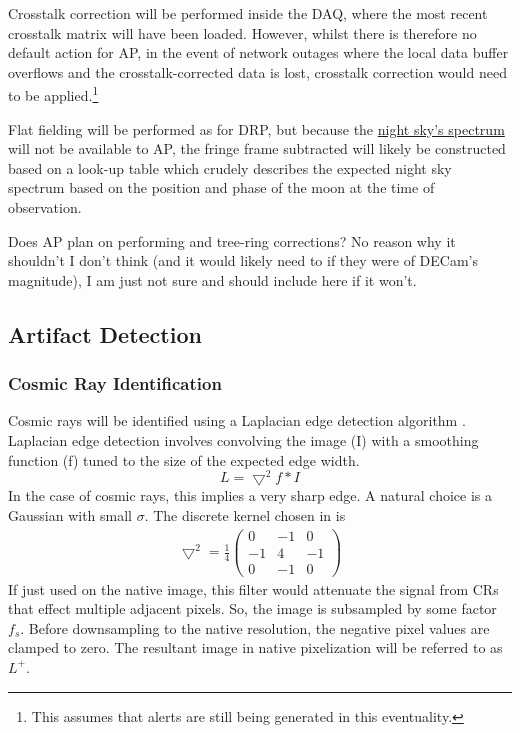 Crosstalk correction will be performed inside the DAQ, where the most recent crosstalk matrix will have been loaded. However, whilst there is therefore no default action for AP, in the event of network outages where the local data buffer overflows and the crosstalk-corrected data is lost, crosstalk correction would need to be applied.\footnote{ This assumes that alerts are still being generated in this eventuality.}

Flat fielding will be performed as for DRP, but because the \hyperref[sec:CPP:aux:nightSkySpectrum]{night sky's spectrum} will not be available to AP, the fringe frame subtracted will likely be constructed based on a look-up table which crudely describes the expected night sky spectrum based on the position and phase of the moon at the time of observation.



\begin{note}
	Does AP plan on performing \bfeffect and tree-ring corrections? No reason why it shouldn't I don't think (and it would likely need to if they were of DECam's magnitude), I am just not sure and should include here if it won't.
\end{note}





\subsection{Artifact Detection}
\label{sec:acArtifactDetection}

\subsubsection{Cosmic Ray Identification}
\label{sec:acCosmicRayDetection}
Cosmic rays will be identified using a Laplacian edge detection algorithm \citep{dokkum01}.  Laplacian edge detection involves convolving the image (I) with a smoothing function (f) tuned to the size of the expected edge width.
\[
L = \bigtriangledown^2f\ast I
\]
In the case of cosmic rays, this implies a very sharp edge.  A natural choice is a Gaussian with small $\sigma$.  The discrete kernel chosen in \citep{dokkum01} is
\begin{align}
\bigtriangledown^2 = \frac{1}{4}\left( \begin{array}{ccc}
0 & -1 & 0 \\
-1 & 4 & -1 \\
0 & -1 & 0 \end{array} \right)
\end{align}
If just used on the native image, this filter would attenuate the signal from CRs that effect multiple
adjacent pixels.  So, the image is subsampled by some factor $f_s$.  Before downsampling to the native resolution, the negative pixel values are clamped to zero.  The resultant image in native pixelization will be referred to as $L^+$.

